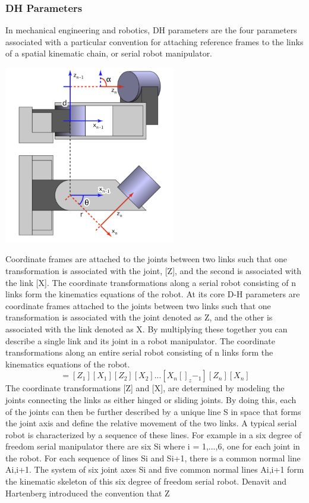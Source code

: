    \subsubsection{DH Parameters}
    In mechanical engineering and robotics, DH parameters are the four parameters associated with a particular convention for attaching reference frames to the links of a spatial kinematic chain, or serial robot manipulator.
    \begin{center}
    \includegraphics[width=75mm]{Dh.PNG}
    \end{center}
    Coordinate frames are attached to the joints between two links such that one transformation is associated with the joint, [Z], and the second is associated with the link [X]. The coordinate transformations along a serial robot consisting of n links form the kinematics equations of the robot. At its core D-H parameters are coordinate frames attached to the joints between two links such that one transformation is associated with the joint denoted as Z, and the other is associated with the link denoted as X. By multiplying these together you can describe a single link and its joint in a robot manipulator. The coordinate transformations along an entire serial robot consisting of n links form the kinematics equations of the robot.
    \begin{equation}
    [T] = [Z_1][X_1][Z_2][X_2]...[X_n[]_z-_1][Z_n][X_n]
    \end{equation}
    The coordinate transformations [Z] and [X], are determined by modeling the joints connecting the links as either hinged or sliding joints. By doing this, each of the joints can then be further described by a unique line S in space that forms the joint axis and define the relative movement of the two links. A typical serial robot is characterized by a sequence of these lines. For example in a six degree of freedom serial manipulator there are six Si where i = 1,...,6, one for each joint in the robot. For each sequence of lines Si and Si+1, there is a common normal line Ai,i+1. The system of six joint axes Si and five common normal lines Ai,i+1 form the kinematic skeleton of this six degree of freedom serial robot. Denavit and Hartenberg introduced the convention that Z 

